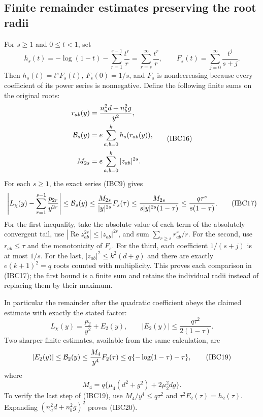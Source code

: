 \subsection{Finite remainder estimates preserving the root radii}

For \(s\geq1\) and \(0\leq t<1\), set
\[
 h_s(t)=-\log(1-t)-\sum_{r=1}^{s-1}\frac{t^r}{r}
       =\sum_{r=s}^{\infty}\frac{t^r}{r},\qquad
 F_s(t)=\sum_{j=0}^{\infty}\frac{t^j}{s+j}.
 \tag{IBC15}
\]
Then \(h_s(t)=t^sF_s(t)\), \(F_s(0)=1/s\), and \(F_s\) is
nondecreasing because every coefficient of its power series is
nonnegative.  Define the following finite sums on the original roots:
\[
 \begin{split}
 r_{ab}(y)&=\frac{n_a^2d+n_b^2g}{y^2},\\
 {\cal B}_s(y)&=e\sum_{a,b=0}^{k}h_s(r_{ab}(y)),\\
 M_{2s}&=e\sum_{a,b=0}^{k}|z_{ab}|^{2s}.
 \end{split}
 \tag{IBC16}
\]
For each \(s\geq1\), the exact series (IBC9) gives
\[
 \left|L_\chi(y)-\sum_{r=1}^{s-1}\frac{p_{2r}}{y^{2r}}\right|
 \leq {\cal B}_s(y)
 \leq\frac{M_{2s}}{|y|^{2s}}F_s(\tau)
 \leq\frac{M_{2s}}{s|y|^{2s}(1-\tau)}
 \leq\frac{q\tau^s}{s(1-\tau)}.
 \tag{IBC17}
\]
For the first inequality, take the absolute value of each term of the
absolutely convergent tail, use
\(|\operatorname{Re} z_{ab}^{2r}|\leq |z_{ab}|^{2r}\),
and sum \(\sum_{r\geq s}r_{ab}^r/r\).
For the second, use \(r_{ab}\leq\tau\) and the monotonicity of \(F_s\).
For the third, each coefficient \(1/(s+j)\) is at most \(1/s\).
For the last, \(|z_{ab}|^2\leq k^2(d+g)\) and there are exactly
\(e(k+1)^2=q\) roots counted with multiplicity.
This proves each comparison in (IBC17); the first bound is a finite
sum and retains the individual radii instead of replacing them by their
maximum.

In particular the remainder after the quadratic coefficient obeys the
claimed estimate with exactly the stated factor:
\[
 L_\chi(y)=\frac{p_2}{y^2}+E_2(y),\qquad
 |E_2(y)|\leq \frac{q\tau^2}{2(1-\tau)}.
 \tag{IBC18}
\]
Two sharper finite estimates, available from the same calculation, are
\[
 |E_2(y)|\leq {\cal B}_2(y)
       \leq \frac{M_4}{y^4}F_2(\tau)
       \leq q\{-\log(1-\tau)-\tau\},
 \tag{IBC19}
\]
where
\[
 M_4=q\{\mu_4(d^2+g^2)+2\mu_2^2dg\}.
 \tag{IBC20}
\]
To verify the last step of (IBC19), use
\(M_4/y^4\leq q\tau^2\) and \(\tau^2F_2(\tau)=h_2(\tau)\).
Expanding \((n_a^2d+n_b^2g)^2\) proves (IBC20).

